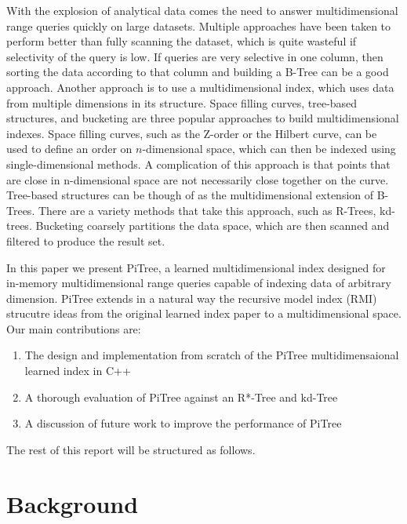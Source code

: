 \documentclass[sigconf,10pt]{acmart}
\begin{document}
With the explosion of analytical data comes the need to answer multidimensional range queries
quickly on large datasets. Multiple approaches have been taken to perform better than
fully scanning the dataset, which is quite wasteful if selectivity
of the query is low. If queries are very selective in one column, then sorting the data
according to that column and building a B-Tree can be a good approach. %
Another approach is to use a multidimensional index, which uses data from multiple dimensions
in its structure. Space filling curves, tree-based structures, and bucketing are three popular approaches
to build multidimensional indexes. Space filling curves, such as the Z-order or the Hilbert curve,
can be used to define an order on $n$-dimensional space, which can then be indexed using 
single-dimensional methods. %
A complication of this approach is that points that are close in
n-dimensional space are not necessarily close together on the curve. %
Tree-based structures can be though of as the multidimensional extension of B-Trees.
There are a variety methods that take this approach, such as R-Trees, kd-trees. %
Bucketing coarsely partitions the data space, which are then scanned and filtered to produce
the result set.

In this paper we present PiTree, a learned multidimensional index designed for
in-memory multidimensional range queries capable of indexing
data of arbitrary dimension. PiTree extends in a natural way the recursive model index (RMI) strucutre
ideas from the original learned index paper to a multidimensional space.
Our main contributions are:
\begin{enumerate}
  \item The design and implementation from scratch of the PiTree multidimensaional learned index in C++
  \item A thorough evaluation of PiTree against an R*-Tree and kd-Tree 
  \item A discussion of future work to improve the performance of PiTree
\end{enumerate}

The rest of this report will be structured as follows. %

\section{Background}
\end{document}
